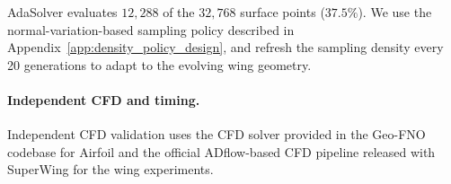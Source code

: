 AdaSolver evaluates $12{,}288$ of the $32{,}768$ surface points ($37.5\%$).
We use the normal-variation-based sampling policy described in
Appendix~\ref{app:density_policy_design}, and refresh the sampling density every 20 generations to
adapt to the evolving wing geometry.



\paragraph{Independent CFD and timing.}

Independent CFD validation uses the CFD solver provided in the Geo-FNO \citep{li2023geofno} codebase for Airfoil and the official ADflow-based CFD pipeline released with SuperWing \citep{yang2025superwing} for the wing experiments.
